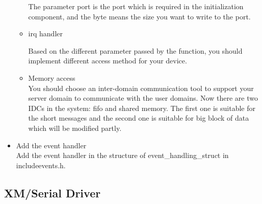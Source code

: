 \begin{itemize}
\begin{itemize}
The parameter port is the port which is required in the initialization component, and the byte means the size you want to write to the port.\\
\item{irq handler}

Based on the different parameter passed by the function, you should implement different access method for your device.\\
\item{Memory access}\\

You should choose an inter-domain communication tool to support your server domain to communicate with the user domains. Now there are two IDCs in the system: fifo and shared memory. The first one is suitable for the short messages and the second one is suitable for big block of data which will be modified partly.\\
\end{itemize}
\item{Add the event handler}
\\
Add the event handler in the structure of event\_handling\_struct in include\/events.h.
\end{itemize}
\subsection{XM/Serial Driver}
